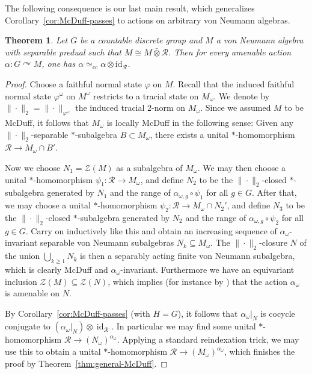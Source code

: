 \documentclass[11pt,a4paper]{article}
\newtheorem{theorem}{Theorem}
\theoremstyle{definition}
\theoremstyle{remark}
\numberwithin{equation}{section}
\numberwithin{theorem}{section}
\newcommand{\acts}{\curvearrowright}
\begin{document}
The following consequence is our last main result, which generalizes Corollary~\ref{cor:McDuff-passes} to actions on arbitrary von Neumann algebras.

\begin{theorem} \label{thm:general-amenable-McDuff}
Let $G$ be a countable discrete group and $M$ a von Neumann algebra with separable predual such that $M \cong M\bar{\otimes} \mathcal{R}$. 
Then for every amenable action $\alpha: G \acts M$, one has $\alpha \simeq_{\mathrm{cc}} \alpha \otimes \mathrm{id}_\mathcal{R}$.
\end{theorem}
\begin{proof}
Choose a faithful normal state $\varphi$ on $M$.
Recall that the induced faithful normal state $\varphi^\omega$ on $M^\omega$ restricts to a tracial state on $M_\omega$. We denote by $\|\cdot\|_2=\|\cdot\|_{\varphi^\omega}$ the induced tracial 2-norm on $M_\omega$.
Since we assumed $M$ to be McDuff, it follows that $M_\omega$ is locally McDuff in the following sense:
Given any $\|\cdot\|_2$-separable $*$-subalgebra $B\subset M_\omega$, there exists a unital $*$-homomorphism $\mathcal R\to M_\omega\cap B'$.

Now we choose $N_1=\mathcal{Z}(M)$ as a subalgebra of $M_\omega$.
We may then choose a unital $*$-homomorphism $\psi_1: \mathcal{R}\to M_\omega$, and define $N_2$ to be the $\|\cdot\|_2$-closed $*$-subalgebra generated by $N_1$ and the range of $\alpha_{\omega,g}\circ\psi_1$ for all $g\in G$.
After that, we may choose a unital $*$-homomorphism $\psi_2: \mathcal{R}\to M_\omega\cap N_2'$, and define $N_3$ to be the $\|\cdot\|_2$-closed $*$-subalgebra generated by $N_2$ and the range of $\alpha_{\omega,g}\circ\psi_2$ for all $g\in G$.
Carry on inductively like this and obtain an increasing sequence of $\alpha_{\omega}$-invariant separable von Neumann subalgebras $N_k\subseteq M_\omega$.
The $\|\cdot\|_2$-closure $N$ of the union $\bigcup_{k\geq 1} N_k$ is then a separably acting finite von Neumann subalgebra, which is clearly McDuff and $\alpha_{\omega}$-invariant.
Furthermore we have an equivariant inclusion $\mathcal{Z}(M)\subseteq\mathcal{Z}(N)$, which implies (for instance by \cite[Theorem 2.4]{Zimmer78}) that the action $\alpha_\omega$ is amenable on $N$.

By Corollary~\ref{cor:McDuff-passes} (with $H=G$), it follows that $\alpha_{\omega}|_N$ is cocycle conjugate to $(\alpha_\omega|_N)\otimes\operatorname{id}_{\mathcal R}$.
In particular we may find some unital $*$-homomorphism $\mathcal R\to (N_\omega)^{\alpha_\omega}$.
Applying a standard reindexation trick, we may use this to obtain a unital $*$-homomorphism $\mathcal R\to (M_\omega)^{\alpha_\omega}$, which finishes the proof by Theorem~\ref{thm:general-McDuff}.
\end{proof}





\end{document}
